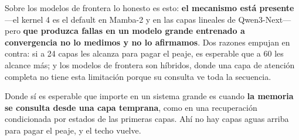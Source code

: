 \documentclass[11pt,a4paper]{article}
\begin{document}
Sobre los modelos de frontera lo honesto es esto: \textbf{el mecanismo está presente} —el kernel 4 es
el default en Mamba-2 y en las capas lineales de Qwen3-Next— pero \textbf{que produzca fallas en un
modelo grande entrenado a convergencia no lo medimos y no lo afirmamos}. Dos razones empujan en
contra: si a 24 capas les alcanza para pagar el peaje, es esperable que a 60 les alcance más; y los
modelos de frontera son híbridos, donde una capa de atención completa no tiene esta limitación porque
su consulta ve toda la secuencia.

Donde sí es esperable que importe en un sistema grande es cuando \textbf{la memoria se consulta desde
una capa temprana}, como en una recuperación condicionada por estados de las primeras capas. Ahí no
hay capas aguas arriba para pagar el peaje, y el techo vuelve.

\vspace{1em}
\begin{center}
\end{center}
\end{document}
